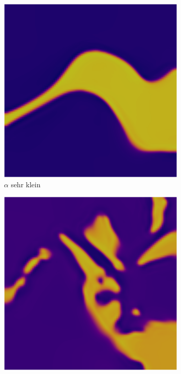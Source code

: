\begin{frame}{}
\begin{figure}
\centering
%
%
\begin{subfigure}{0.32\textwidth}
\centering
\includegraphics[width=\textwidth]{images/ach_sim/very_weak.pdf}
\caption{$\alpha$ sehr klein}
\end{subfigure}
%
\begin{subfigure}{0.32\textwidth}
\centering
\includegraphics[width=\textwidth]{images/ach_sim/weak.pdf}

\end{subfigure}
\end{figure}
\end{frame}
